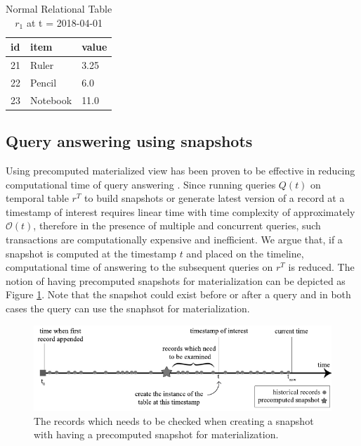 \begin{center}
\begin{table}
	\centering
	\caption{Normal Relational Table $r_1$ at t = 2018-04-01}
	\label{table:normal_table_2_t}
	\begin{tabular}{p{4cm}p{4cm}p{4cm}}
		\hline
		id & item  & value  \\ \hline
		21 & Ruler & 3.25 \\
		22 & Pencil & 6.0   \\ 
		23 & Notebook & 11.0 \\ \hline
	\end{tabular}
\end{table}
\end{center}

\subsection{Query answering using snapshots} 

Using precomputed materialized view has been proven to be effective in reducing computational time of query answering \cite{sohrabi2016materialized} \cite{du2017deepsea}. Since running queries $Q(t)$ on temporal table $r^T$ to build snapshots or generate latest version of a record at a timestamp of interest requires linear time with time complexity of approximately $\mathcal{O}(t)$, therefore in the presence of multiple and concurrent queries, such transactions are computationally expensive and inefficient. We argue that, if a snapshot is computed at the timestamp $t$ and placed on the timeline, computational time of answering to the subsequent queries on $r^T$ is reduced. The notion of having precomputed snapshots for materialization can be depicted as Figure \ref{fig:snapshot_materialization}. Note that the snapshot could exist before or after a query and in both cases the query can use the snaphsot for materialization.

\begin{figure}[t]
	\centering
	\includegraphics[width=\textwidth]{figs/snapshot_materialization.pdf}
	\caption{The records which needs to be checked when creating a snapshot with having a precomputed snapshot for materialization.}
	\label{fig:snapshot_materialization}
\end{figure}

